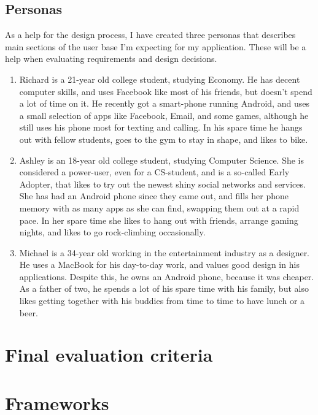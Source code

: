 \documentclass[]{report}
\begin{document}
\subsection{Personas}

As a help for the design process, I have created three personas that describes
main sections of the user base I'm expecting for my application. These will be a
help when evaluating requirements and design decisions.

\begin{enumerate}
\item Richard is a 21-year old college student, studying Economy. He has decent
  computer skills, and uses Facebook like most of his friends, but doesn't spend
  a lot of time on it. He recently got a smart-phone running Android, and uses a
  small selection of apps like Facebook, Email, and some games, although he
  still uses his phone most for texting and calling. In his spare time he hangs
  out with fellow students, goes to the gym to stay in shape, and likes to bike.
\item Ashley is an 18-year old college student, studying Computer Science. She
  is considered a power-user, even for a CS-student, and is a so-called Early
  Adopter, that likes to try out the newest shiny social networks and
  services. She has had an Android phone since they came out, and fills her
  phone memory with as many apps as she can find, swapping them out at a rapid
  pace. In her spare time she likes to hang out with friends, arrange gaming
  nights, and likes to go rock-climbing occasionally.
\item Michael is a 34-year old working in the entertainment industry as a
  designer. He uses a MacBook for his day-to-day work, and values good design in
  his applications. Despite this, he owns an Android phone, because it was
  cheaper. As a father of two, he spends a lot of his spare time with his
  family, but also likes getting together with his buddies from time to time to
  have lunch or a beer.
\end{enumerate}

\section{Final evaluation criteria}

\section{Frameworks}
\end{document}
